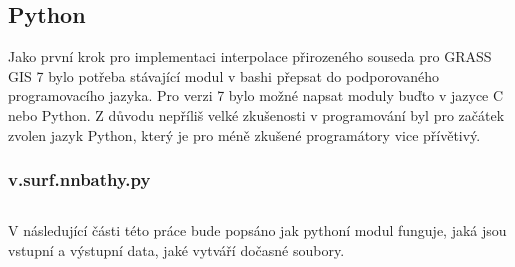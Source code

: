 \documentclass[12pt,a4paper]{article}
\begin{document}

\newpage
\subsection{Python}
Jako první krok pro implementaci interpolace přirozeného souseda pro GRASS GIS 7 bylo potřeba stávající modul v bashi přepsat do podporovaného programovacího jazyka. Pro verzi 7 bylo možné napsat moduly buďto v jazyce C nebo Python. Z důvodu nepříliš velké zkušenosti v programování byl pro začátek zvolen jazyk Python, který je pro méně zkušené programátory vice přívětivý. 

\subsubsection{v.surf.nnbathy.py}
\begin{lstlisting}
\end{lstlisting}

V následující části této práce bude popsáno jak pythoní modul funguje, jaká jsou vstupní a výstupní data, jaké vytváří dočasné soubory.
\end{document}
